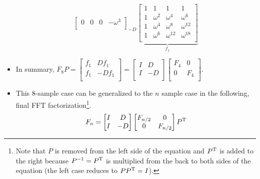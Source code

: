 \documentclass{article}
\begin{document}
\begin{itemize}
\begin{equation*}
{\begin{bmatrix}
                0 & 0 & 0 & -\omega^3\\
            \end{bmatrix}
        }_{-D} \underbrace{
            \begin{bmatrix}
                1 & 1 & 1 & 1\\
                1 & \omega^2 & \omega^4    & \omega^6   \\
                1 & \omega^4 & \omega^8    & \omega^{12}\\
                1 & \omega^6 & \omega^{12} & \omega^{18}\\
            \end{bmatrix}
        }_{f_1}
    \end{equation*}
    \item In summary, $
        F_8P =
        \begin{bmatrix}
            f_1 & Df_1\\
            f_1 & -Df_1\\
        \end{bmatrix}
        =
        \begin{bmatrix}
            I & D\\
            I & -D\\
        \end{bmatrix}
        \begin{bmatrix}
            F_4 & 0\\
            0 & F_4\\
        \end{bmatrix}
    $.
    \item This 8-sample case can be generalized to the $n$ sample case in the following, final FFT factorization\footnote{Note that $P$ is removed from the left side of the equation and $P^{\text{T}}$ is added to the right because $P^{-1}=P^{\text{T}}$ is multiplied from the back to both sides of the equation (the left case reduces to $PP^{\text{T}}=I$).}.
    \begin{equation*}
        F_n =
        \begin{bmatrix}
            I & D\\
            I & -D\\
        \end{bmatrix}
        \begin{bmatrix}
            F_{n/2} & 0\\
            0 & F_{n/2}\\
        \end{bmatrix}
        P^{\text{T}}
    \end{equation*}

\end{itemize}
\end{document}
